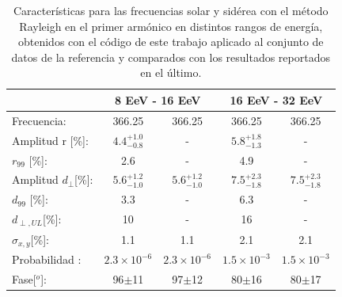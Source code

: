 \begin{table}[H]
    \begin{small}
        \begin{center}
            \begin{tabular}[c]{l|c|c||c|c|}
                                            & \multicolumn{2}{|c||}{8 EeV - 16 EeV}              & \multicolumn{2}{|c|}{16 EeV - 32 EeV}                   \\ \hline
                Frecuencia:                 & 366.25                    & 366.25 \cite{Aab_2020} & 366.25                   & 366.25 \cite{Aab_2020}   \\ \hline
                Amplitud r [\%]:            & $4.4^{+1.0}_{-0.8}$ 	    & -                      & $5.8^{+1.8}_{-1.3}$ 	    & -                         \\
                $r_{99}$ [\%]:              & 2.6                       & -                      & 4.9                      & -                          \\\hline
                Amplitud $d_\perp$[\%]:     & $5.6^{+1.2}_{-1.0}$ 	    & $5.6^{+1.2}_{-1.0}$    & $7.5^{+2.3}_{-1.8}$ 	    & $7.5^{+2.3}_{-1.8}$                   \\
                $d_{99}$ [\%]:              & 3.3                       & -                      & 6.3                      & -                         \\
                $d_{\perp,UL}$[\%]:         & 10                        & -                      & 16                       & -                                 \\\hline
                $\sigma_{x,y}$[\%]:         & 1.1	                    & 1.1                    & 2.1	                    & 2.1                           \\
                Probabilidad      :         & $2.3\times10^{-6}$	    & $2.3\times10^{-6}$     & $1.5\times10^{-3}$	    & $1.5\times10^{-3}$              \\
                Fase[$^o$]:                 & 96$\pm$11                 & 97$\pm$12              & 80$\pm$16                & 80$\pm$17                     \\
            \end{tabular}
        \end{center}
    \end{small}
    \caption{Características para las frecuencias solar y sidérea con el método Rayleigh en el primer armónico en distintos rangos de energía, obtenidos con el código de este trabajo aplicado al conjunto de datos de la referencia \cite{Aab_2020} y comparados con los resultados reportados en el último.}
\end{table}


